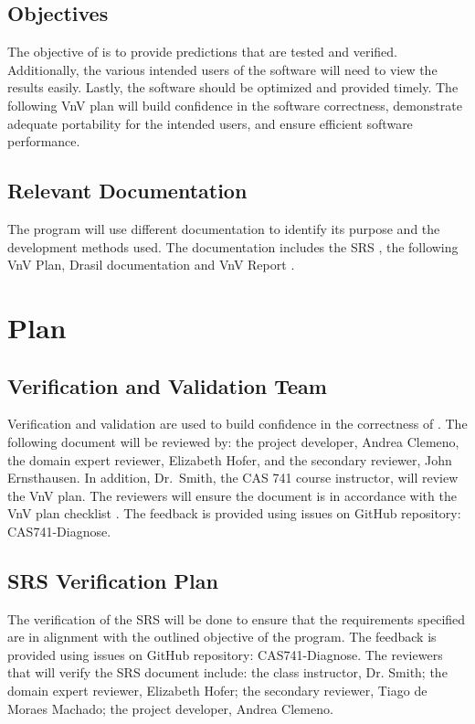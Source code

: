 \documentclass[12pt, titlepage]{article}
\begin{document}
\subsection{Objectives}

The objective of \progname{} is to provide predictions that are tested and 
verified. Additionally, the various intended users of the software will need to view the 
results easily. Lastly, the software should be optimized and provided timely. 
The following VnV plan will build confidence in the software correctness, 
demonstrate adequate portability for the intended users, and ensure efficient 
software performance.


\subsection{Relevant Documentation}

The \progname{} program will use different documentation to identify its 
purpose and the development methods used. The documentation includes the SRS 
\citep{SRS}, the following VnV Plan, Drasil documentation \citep{DrasilSRS}
and VnV Report \citep{DiagnoseVNVreport}.



\section{Plan}
	
\subsection{Verification and Validation Team}

Verification and validation are used to build confidence in the correctness of 
\progname{}. The following document will be reviewed by: the project developer, 
Andrea Clemeno, the domain expert reviewer, Elizabeth Hofer, and the secondary 
reviewer, John Ernsthausen. In addition, Dr.\ Smith, the CAS 741 course 
instructor, will review the VnV plan. The reviewers will ensure the document is 
in accordance with the VnV plan checklist \citep{Vnvchecklist}. The feedback 
is provided using issues on GitHub repository: CAS741-Diagnose. 

\subsection{SRS Verification Plan}

The verification of the SRS will be done to ensure that the requirements 
specified are in alignment with the outlined objective of the \progname{} 
program. The feedback 
is provided using issues on GitHub repository: CAS741-Diagnose. The 
reviewers that will verify the SRS document include: the class instructor, Dr. 
Smith;  the domain expert reviewer, Elizabeth Hofer; the secondary reviewer, 
Tiago de Moraes Machado; the project developer, Andrea Clemeno.
\end{document}
